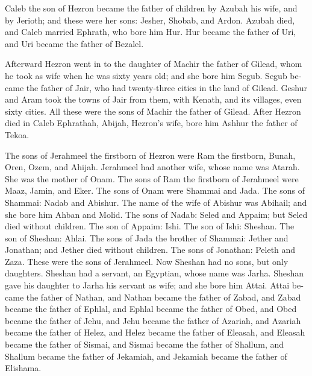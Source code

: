 \begin{paracol}{2}
\begin{otherlanguage}{english}
 Caleb the son of Hezron became the father of children by
Azubah his wife, and by Jerioth; and these were her sons: Jesher,
Shobab, and Ardon.  Azubah died, and Caleb married
Ephrath, who bore him Hur.  Hur became the father of Uri,
and Uri became the father of Bezalel.

 Afterward Hezron went in to the daughter of Machir the
father of Gilead, whom he took as wife when he was sixty years old; and
she bore him Segub.  Segub became the father of Jair, who
had twenty-three cities in the land of Gilead.  Geshur
and Aram took the towns of Jair from them, with Kenath, and its
villages, even sixty cities. All these were the sons of Machir the
father of Gilead.  After Hezron died in Caleb Ephrathah,
Abijah, Hezron's wife, bore him Ashhur the father of Tekoa.

 The sons of Jerahmeel the firstborn of Hezron were Ram
the firstborn, Bunah, Oren, Ozem, and Ahijah.  Jerahmeel
had another wife, whose name was Atarah. She was the mother of Onam.
 The sons of Ram the firstborn of Jerahmeel were Maaz,
Jamin, and Eker.  The sons of Onam were Shammai and Jada.
The sons of Shammai: Nadab and Abishur.  The name of the
wife of Abishur was Abihail; and she bore him Ahban and Molid.
 The sons of Nadab: Seled and Appaim; but Seled died
without children.  The son of Appaim: Ishi. The son of
Ishi: Sheshan. The son of Sheshan: Ahlai.  The sons of
Jada the brother of Shammai: Jether and Jonathan; and Jether died
without children.  The sons of Jonathan: Peleth and Zaza.
These were the sons of Jerahmeel.  Now Sheshan had no
sons, but only daughters. Sheshan had a servant, an Egyptian, whose name
was Jarha.  Sheshan gave his daughter to Jarha his
servant as wife; and she bore him Attai.  Attai became
the father of Nathan, and Nathan became the father of Zabad,
 and Zabad became the father of Ephlal, and Ephlal became
the father of Obed,  and Obed became the father of Jehu,
and Jehu became the father of Azariah,  and Azariah
became the father of Helez, and Helez became the father of Eleasah,
 and Eleasah became the father of Sismai, and Sismai
became the father of Shallum,  and Shallum became the
father of Jekamiah, and Jekamiah became the father of Elishama.


\end{otherlanguage}
\end{paracol}
